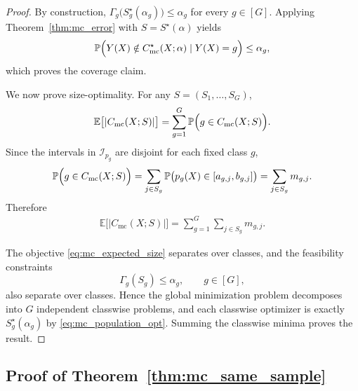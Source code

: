 \documentclass[11pt]{article}
\theoremstyle{statplain}
\theoremstyle{statdefinition}
\newcommand{\mc}{\mathrm{mc}}
\newcommand{\E}{\mathbb{E}}
\newcommand{\PP}{\mathbb{P}}
\newcommand{\0}{\mathbf{0}}
\newcommand{\I}{\mathcal{I}}
\newcommand{\intervalset}{\I} %
\newcommand{\numClass}{G} %
\newcommand{\iteratorClass}{g}
\begin{document}
\begin{proof}
By construction, $\Gamma_{\iteratorClass}\bigl(S_\iteratorClass^\star(\alpha_\iteratorClass)\bigr)\le \alpha_\iteratorClass$ for every $\iteratorClass\in[\numClass]$.
Applying Theorem~\ref{thm:mc_error} with $S=S^\star(\alpha)$ yields
\[
\PP\Bigl(Y(X)\notin C_{\mc}^\star(X;\alpha)\mid Y(X)=\iteratorClass\Bigr)
\le
\alpha_\iteratorClass,
\]
which proves the coverage claim.

We now prove size-optimality.
For any $S=(S_1,\ldots,S_\numClass)$,
\begin{align*}
\E\bigl[|C_{\mc}(X;S)|\bigr]
=
\sum_{\iteratorClass=1}^{\numClass}
\PP\Bigl(\iteratorClass\in C_{\mc}(X;S)\Bigr).
\end{align*}
Since the intervals in $\intervalset_{p_\iteratorClass}$ are disjoint for each fixed class $\iteratorClass$,
\[
\PP\Bigl(\iteratorClass\in C_{\mc}(X;S)\Bigr)
=
\sum_{j\in S_\iteratorClass}
\PP\bigl(p_\iteratorClass(X)\in [a_{\iteratorClass,j},b_{\iteratorClass,j}]\bigr)
=
\sum_{j\in S_\iteratorClass} m_{\iteratorClass,j}.
\]
Therefore
\begin{align}
\E\bigl[|C_{\mc}(X;S)|\bigr]
=
\sum_{\iteratorClass=1}^{\numClass}
\sum_{j\in S_\iteratorClass} m_{\iteratorClass,j}.
\label{eq:mc_expected_size}
\end{align}

The objective \eqref{eq:mc_expected_size} separates over classes, and the feasibility constraints
\[
\Gamma_{\iteratorClass}(S_\iteratorClass)\le \alpha_\iteratorClass,
\qquad
\iteratorClass\in[\numClass],
\]
also separate over classes.
Hence the global minimization problem decomposes into $\numClass$ independent classwise problems, and each classwise optimizer is exactly $S_\iteratorClass^\star(\alpha_\iteratorClass)$ by \eqref{eq:mc_population_opt}.
Summing the classwise minima proves the result.
\end{proof}

\subsection{Proof of Theorem~\ref{thm:mc_same_sample}}
\label{proof_thm:mc_same_sample}
\end{document}
